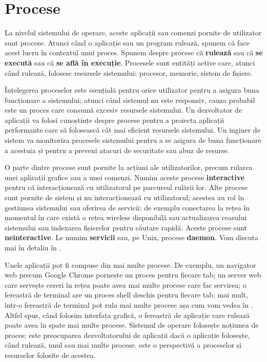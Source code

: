 \chapter{Procese}
\label{chapter:process}

La nivelul sistemului de operare, aceste aplicații sau comenzi pornite de
utilizator sunt procese. Atunci când o aplicație sau un program rulează, spunem
că face acest lucru în contextul unui proces. Spunem despre procese că
\textbf{rulează} sau că \textbf{se execută} sau că \textbf{se află în execuție}.
Procesele sunt entități active care, atunci când rulează, folosesc resursele
sistemului: procesor, memorie, sistem de fișiere.

Înțelegerea proceselor este esențială pentru orice utilizator pentru a asigura
buna funcționare a sistemului; atunci când sistemul nu este responsiv, cauza
probabil este un proces care consumă excesiv resursele sistemului. Un
dezvoltator de aplicații va folosi cunoștințe despre procese pentru a proiecta
aplicații performante care să folosească cât mai eficient resursele sistemului.
Un inginer de sistem va monitoriza procesele sistemului pentru a se asigura de
buna funcționare a acestuia și pentru a preveni atacuri de securitate sau abuz
de resurse.

O parte dintre procese sunt pornite la acțiuni ale utilizatorilor, precum
rularea unei aplicații grafice sau a unei comenzi. Numim aceste procese
\textbf{interactive} pentru că interacționează cu utilizatorul pe parcursul
rulării lor. Alte procese sunt pornite de sistem și nu interacționează cu
utilizatorul; acestea au rol în gestiunea sistemului sau oferirea de servicii:
de exemplu conectarea la rețea în momentul în care există o rețea wireless
disponibilă sau actualizarea ceasului sistemului sau indexarea fișierelor pentru
căutare rapidă. Aceste procese sunt \textbf{neinteractive}. Le numim
\textbf{servicii} sau, pe Unix, procese \textbf{daemon}. Vom discuta mai în
detaliu în .

Unele aplicații pot fi compuse din mai multe procese. De exemplu, un navigator
web precum Google Chrome pornește un proces pentru fiecare tab; un server web
care servește cereri în rețea poate avea mai multe procese care fac servirea; o
fereastră de terminal are un proces shell deschis pentru fiecare tab;
mai mult, într-o fereastră de terminal pot rula mai multe procese așa cum vom
vedea în .
Altfel spus, când folosim interfața grafică, o fereastră de aplicație care
rulează poate avea în spate mai multe procese. Sistemul de operare folosește
noțiunea de proces; este preocuparea dezvoltatorului de aplicații dacă o
aplicație folosește, când rulează, unul sau mai multe procese.  este o perspectivă a proceselor și resurselor folosite de acestea.

